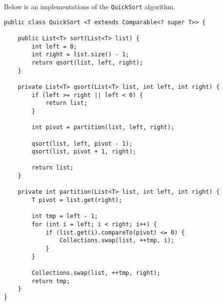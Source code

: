 \documentclass{article}
\begin{document}
Below is an implementations of the \texttt{QuickSort} algorithm.
    \begin{lstlisting}
public class QuickSort <T extends Comparable<? super T>> {

    public List<T> sort(List<T> list) {
        int left = 0;
        int right = list.size() - 1;
        return qsort(list, left, right);
    }

    private List<T> qsort(List<T> list, int left, int right) {
        if (left >= right || left < 0) {
            return list;
        }

        int pivot = partition(list, left, right);

        qsort(list, left, pivot - 1);
        qsort(list, pivot + 1, right);

        return list;
    }

    private int partition(List<T> list, int left, int right) {
        T pivot = list.get(right);

        int tmp = left - 1;
        for (int i = left; i < right; i++) {
            if (list.get(i).compareTo(pivot) <= 0) {
                Collections.swap(list, ++tmp, i);
            }
        }

        Collections.swap(list, ++tmp, right);
        return tmp;
    }
}

        
    \end{lstlisting}
\end{document}
